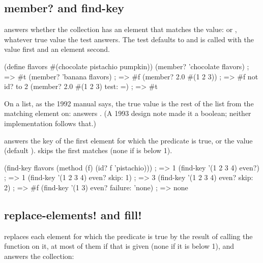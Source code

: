 \subsection{member? and find-key}

answers whether the collection has an element that matches the value:
 or , whatever true value the test answers. The test
defaults to  and is called with the value first and an element
second.

\begin{dylan}
(define flavors #(chocolate pistachio pumpkin))
(member? 'chocolate flavors)         ; => #t
(member? 'banana flavors)            ; => #f
(member? 2.0 #(1 2 3))               ; => #f      not id? to 2
(member? 2.0 #(1 2 3) test: =)       ; => #t
\end{dylan}

\noindent On a list, as the 1992 manual says, the true value is the rest
of the list from the matching element on: 
answers . (A 1993 design note made it a boolean; neither
implementation follows that.)

 answers the key of
the first element for which the predicate is true, or the
 value (default ).   skips
the first  matches (none if  is below 1).

\begin{dylan}
(find-key flavors (method (f) (id? f 'pistachio)))   ; => 1
(find-key '(1 2 3 4) even?)                          ; => 1
(find-key '(1 2 3 4) even? skip: 1)                  ; => 3
(find-key '(1 2 3 4) even? skip: 2)                  ; => #f
(find-key '(1 3) even? failure: 'none)               ; => none
\end{dylan}

\subsection{replace-elements! and fill!}

 replaces each element for which the
predicate is true by the result of calling the function on it, at most
 of them if that is given (none if it is below 1), and
answers the collection:

